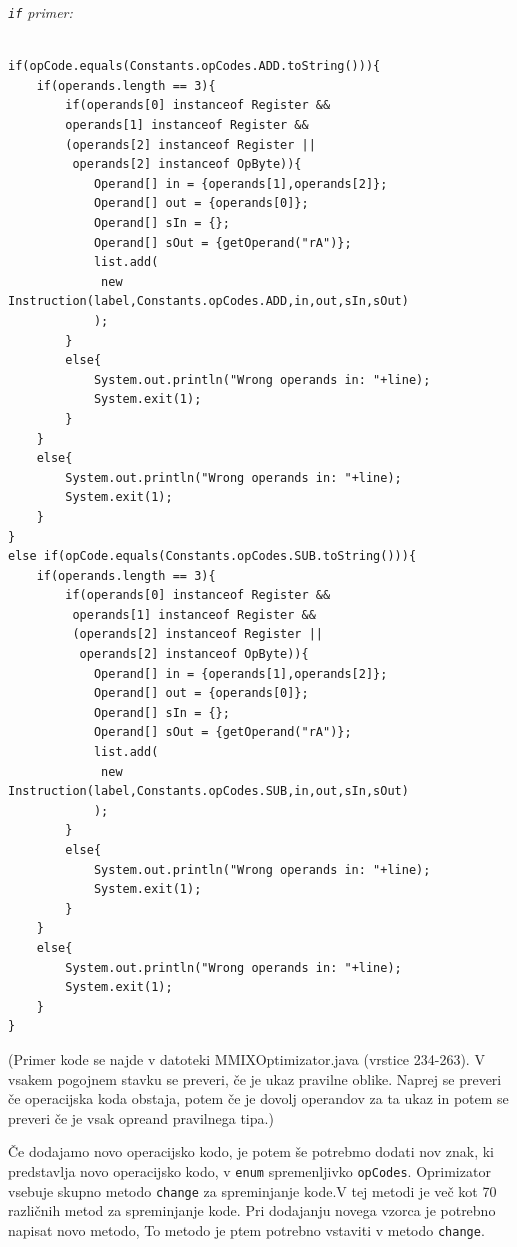 \documentclass[a4paper, 12pt]{book}
\begin{document}
\noindent
{\it \texttt{if} primer:}
		\begin{Verbatim}[baselinestretch=1]
		
if(opCode.equals(Constants.opCodes.ADD.toString())){
    if(operands.length == 3){
	    if(operands[0] instanceof Register && 
	    operands[1] instanceof Register && 
	    (operands[2] instanceof Register ||
	     operands[2] instanceof OpByte)){
            Operand[] in = {operands[1],operands[2]};
            Operand[] out = {operands[0]};
            Operand[] sIn = {};
            Operand[] sOut = {getOperand("rA")};
            list.add(
             new Instruction(label,Constants.opCodes.ADD,in,out,sIn,sOut)
            );
        }
        else{
            System.out.println("Wrong operands in: "+line); 
            System.exit(1);
        }
    }
    else{
        System.out.println("Wrong operands in: "+line);
        System.exit(1);
    }
}
else if(opCode.equals(Constants.opCodes.SUB.toString())){
    if(operands.length == 3){
        if(operands[0] instanceof Register &&
         operands[1] instanceof Register && 
         (operands[2] instanceof Register ||
          operands[2] instanceof OpByte)){
            Operand[] in = {operands[1],operands[2]};
            Operand[] out = {operands[0]};
            Operand[] sIn = {};
            Operand[] sOut = {getOperand("rA")};
            list.add(
             new Instruction(label,Constants.opCodes.SUB,in,out,sIn,sOut)
            );
        }
        else{
            System.out.println("Wrong operands in: "+line); 
            System.exit(1);
        }
    }
    else{
        System.out.println("Wrong operands in: "+line);
        System.exit(1);
    }
}
		\end{Verbatim}
\noindent
{\small (Primer kode se najde v datoteki MMIXOptimizator.java (vrstice 234-263). V vsakem pogojnem stavku se preveri, če je ukaz pravilne oblike. Naprej se preveri če operacijska koda obstaja, potem če je dovolj operandov za ta ukaz in potem se preveri če je vsak opreand pravilnega tipa.)}

Če dodajamo novo operacijsko kodo, je potem še potrebmo dodati nov znak, ki predstavlja novo operacijsko kodo, v \texttt{enum} spremenljivko \texttt{opCodes}. Oprimizator vsebuje skupno metodo \texttt{change} za spreminjanje kode.V tej metodi je več kot 70 različnih metod za spreminjanje kode. Pri dodajanju novega vzorca je potrebno napisat novo metodo, To metodo je ptem potrebno vstaviti v metodo \texttt{change}.


\medskip
\end{document}
